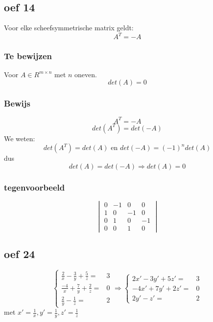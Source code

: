 \documentclass[10pt,a4paper]{article}
\begin{document}
\subsection*{oef 14}
Voor elke scheefsymmetrische matrix geldt:
\[
A^T= -A
\]
\subsubsection*{Te bewijzen}
Voor $A\in R^{m\times n}$ met $n$ oneven.
\[
det(A) = 0
\]
\subsubsection*{Bewijs}
\[
A^T = -A
\]
\[
det(A^T) = det(-A)
\]
We weten:
\[
det(A^T) = det(A) \text{ en } det(-A) = (-1)^n det(A)
\]
dus
\[
det(A) = det(-A) \Rightarrow det(A) = 0
\]

\subsubsection*{tegenvoorbeeld}
\[
\begin{vmatrix}
0 & -1 & 0 & 0\\
1 & 0 & -1 & 0\\
0 & 1 & 0 & -1\\
0 & 0 & 1 & 0
\end{vmatrix}
\]

\subsection*{oef 24}
\[ \left\{
     \begin{array}{lr}
       \frac{2}{x}-\frac{3}{y}+\frac{5}{z} = & 3 \\
       \frac{-4}{x}+\frac{7}{y}+\frac{2}{z} = & 0 \\
       \frac{2}{y}-\frac{1}{z} = & 2
     \end{array}
   \right. \Rightarrow\left\{
     \begin{array}{lr}
       2x'-3y'+5z' = & 3 \\
       -4x'+7y'+2z' = & 0 \\
       2y'-z' = & 2
     \end{array}
   \right.
\]
met $x' = \frac{1}{x}, y' = \frac{1}{y}, z' = \frac{1}{z}$
\end{document}
